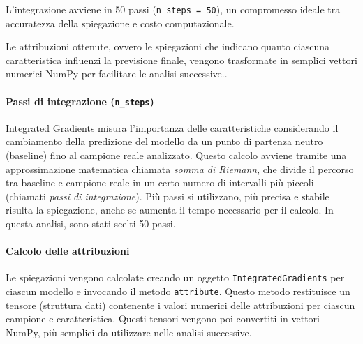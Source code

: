 \documentclass[a4paper,11pt]{article}
\begin{document}
L'integrazione avviene in 50 passi (\texttt{n\_steps = 50}), un compromesso ideale tra accuratezza della spiegazione e costo computazionale.

Le attribuzioni ottenute, ovvero le spiegazioni che indicano quanto ciascuna caratteristica influenzi la previsione finale, vengono trasformate in semplici vettori numerici NumPy per facilitare le analisi successive..

\paragraph{Passi di integrazione (\texttt{n\_steps})}
Integrated Gradients misura l'importanza delle caratteristiche considerando il cambiamento della predizione del modello da un punto di partenza neutro (baseline) fino al campione reale analizzato. Questo calcolo avviene tramite una approssimazione matematica chiamata \emph{somma di Riemann}, che divide il percorso tra baseline e campione reale in un certo numero di intervalli più piccoli (chiamati \emph{passi di integrazione}). Più passi si utilizzano, più precisa e stabile risulta la spiegazione, anche se aumenta il tempo necessario per il calcolo. In questa analisi, sono stati scelti 50 passi.

\paragraph{Calcolo delle attribuzioni}
Le spiegazioni vengono calcolate creando un oggetto \texttt{IntegratedGradients} per ciascun modello e invocando il metodo \texttt{attribute}. Questo metodo restituisce un tensore (struttura dati) contenente i valori numerici delle attribuzioni per ciascun campione e caratteristica. Questi tensori vengono poi convertiti in vettori NumPy, più semplici da utilizzare nelle analisi successive.
\end{document}
